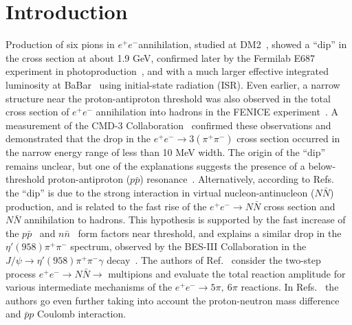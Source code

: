 \documentclass[12pt]{elsarticle}
\def\epem {\ensuremath{e^+ e^-}}
\begin{document}
\section{ \boldmath Introduction}
\hspace*{\parindent}
Production of six pions in \epem annihilation, studied at 
DM2~\cite{6pidm2,6pith1,dbase}, 
showed a ``dip'' in the cross section at about 1.9 GeV, confirmed later by 
the Fermilab E687 experiment in photoproduction~\cite{focus, focus1}, 
and with a much larger effective integrated luminosity at BaBar~\cite{isr6pi}
using initial-state radiation (ISR).
Even earlier, a narrow structure near the  proton-antiproton threshold 
was also observed in the total cross section of $e^+e^-$ annihilation 
into hadrons in the FENICE experiment~\cite{fenice}.
A measurement of the CMD-3 Collaboration~\cite{cmd6pi} confirmed these 
observations and demonstrated that the drop in the $e^+e^- \to 3(\pi^+\pi^-)$ 
cross section occurred in the narrow energy range of less than 10 MeV width.  
The origin of the ``dip'' remains unclear, but one of the 
explanations suggests the presence of a below-threshold proton-antiproton
($p\bar p$) resonance~\cite{ppbartheory}.
 Alternatively, according to Refs.~\cite{han,Milst1,Milst2,Milst3} 
the ``dip'' is due to the strong interaction in virtual  nucleon-antinucleon 
($N\bar N$) production, and is related to the fast rise of the 
$e^+e^- \to N\bar N$ cross section and $N\bar N$ annihilation to hadrons. 
This hypothesis is supported by the fast increase of
the $p\bar p$~\cite{isrppbar, cmdppbar} and $n\bar n$~\cite{sndnnbar} 
form factors near threshold, and explains a similar drop in the 
$\eta'(958)\pi^+\pi^-$ spectrum, observed by the BES-III 
Collaboration in the $J/\psi \to \eta'(958)\pi^+\pi^-\gamma$ 
decay~\cite{etaprimpipi}. The authors of Ref.~\cite{han}
consider the two-step process $e^+e^- \to N\bar N \to$ multipions
and evaluate the total reaction amplitude for various intermediate mechanisms
of the  $e^+e^- \to 5\pi,~6\pi$ reactions. In 
Refs.~\cite{Milst1,Milst2,Milst3} the authors 
go even further taking into account the proton-neutron mass difference 
and $\bar{p}p$ Coulomb interaction. 
\end{document}
